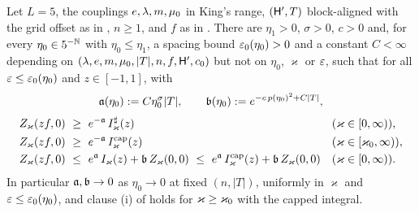 \begin{proposition}\label{rot:prop:SW1}
Let $L=5$, the couplings $e,\lambda,m,\mu_0$ in King's range, $(\mathsf H',T)$ block-aligned with the grid offset as in , $n\ge1$, and $f$ as in . There are $\eta_1>0$, $\sigma>0$, $c>0$ and, for every $\eta_0\in5^{-\mathbb N}$ with $\eta_0\le\eta_1$, a spacing bound $\varepsilon_0(\eta_0)>0$ and a constant $C<\infty$ depending on $(\lambda,e,m,\mu_0,|T|,n,f,\mathsf H',c_0)$ but not on $\eta_0$, $\varkappa$ or $\varepsilon$, such that for all $\varepsilon\le\varepsilon_0(\eta_0)$ and $z\in[-1,1]$, with
\[
\mathfrak a(\eta_0):= C\eta_0^{\sigma}|T|,\qquad\mathfrak b(\eta_0):= e^{-c\,p(\eta_0)^2+C|T|},
\]
\begin{align*}
Z_\varkappa(zf,0)&\ \ge\ e^{-\sfa}\,\Ish_\varkappa(z)&&(\varkappa\in[0,\infty)),\\
Z_\varkappa(zf,0)&\ \ge\ e^{-\sfa}\,\Icap_\varkappa(z)&&(\varkappa\in[\kz,\infty)),\\
Z_\varkappa(zf,0)&\ \le\ e^{\sfa}\,\Ifull_\varkappa(z)+\sfb\,Z_\varkappa(0,0)\ \le\ e^{\sfa}\,\Icap_\varkappa(z)+\sfb\,Z_\varkappa(0,0)&&(\varkappa\in[0,\infty)).
\end{align*}
In particular $\mathfrak a,\mathfrak b\to0$ as $\eta_0\to0$ at fixed $(n,|T|)$, uniformly in $\varkappa$ and $\varepsilon\le\varepsilon_0(\eta_0)$, and clause \textup{(i)} of  holds for $\varkappa\ge\varkappa_0$ with the capped integral.
\end{proposition}

